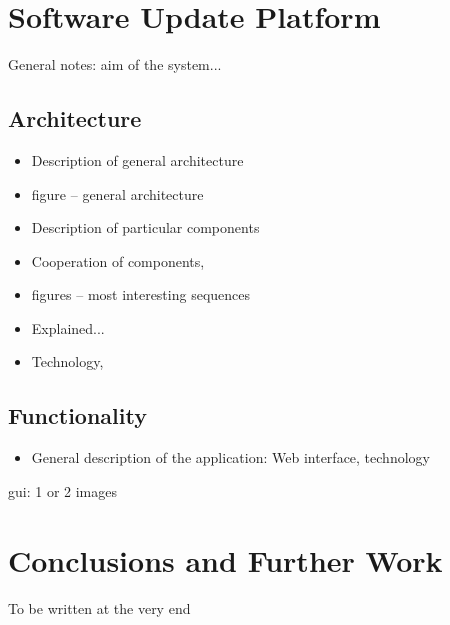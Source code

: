 \documentclass[10pt]{article}
\begin{document}
\section{Software Update Platform}

General notes: aim of the system... 


\subsection{Architecture}

\begin{itemize}
	\item Description of general architecture 
	\item figure -- general architecture 
	\item Description of particular components 
	\item Cooperation of components, 
	\item figures -- most interesting sequences  
	\item Explained... 
	\item Technology, 
\end{itemize}


\subsection{Functionality}

\begin{itemize}
	\item General description of the application: Web interface, technology 
\end{itemize}

gui: 1 or 2 images 




\section{Conclusions and Further Work}

To be written at the very end 
\end{document}
